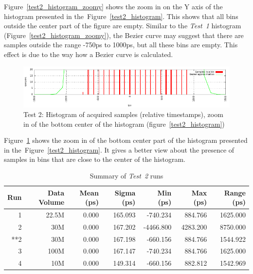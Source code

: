 \documentclass[a4paper, 12pt]{article}
\begin{document}
Figure~\ref{test2_histogram_zoomy} shows the zoom in on the Y axis of
the histogram presented in the~Figure~\ref{test2_histogram}.
This shows that all bins outside the center part of the figure are empty.
Similar to the \textit{Test~1} histogram (Figure~\ref{test2_histogram_zoomy}),
the Bezier curve may suggest that
there are samples outside the range -750ps to 1000ps, but all these bins are
empty.
This effect is due to the way how a Bezier curve is calculated.


\begin{figure}[ht!]
  \centering
  \includegraphics[width=1\textwidth]{img/test2_histogram_zoomx.pdf}
  \caption{Test 2: Histogram of acquired samples (relative timestamps),
           zoom in of the bottom center of the histogram
           (figure~\ref{test2_histogram})}
  \label{test2_histogram_zoomx}
\end{figure}
\FloatBarrier

Figure~\ref{test2_histogram_zoomx} shows the zoom in of the bottom center part
of the histogram presented in the~Figure~\ref{test2_histogram}.
It gives a better view about the presence of samples in bins that are close to
the center of the histogram.


\begin{table}[!htb]
  \centering
  \footnotesize
  \begin{tabular}{|r|r|r|r|r|r|r|}
    \hline {\bf Run} & {\bf Data Volume} & {\bf Mean (ps)} & {\bf Sigma (ps)} & {\bf Min (ps)} & {\bf Max (ps)} & {\bf Range (ps)}  \\
    \hline
    1                & 22.5M             &          0.000  &  165.093         &  -740.234      &   884.766      &     1625.000        \\
    2                & 30M               &          0.000  &  167.202         & -4466.800      &  4283.200      &     8750.000        \\
    **2              & 30M               &          0.000  &  167.198         &  -660.156      &   884.766      &     1544.922        \\
    3                & 100M              &          0.000  &  167.147         &  -740.234      &   884.766      &     1625.000        \\
    4                & 10M               &          0.000  &  149.314         &  -660.156      &   882.812      &     1542.969 \\

    \hline
  \end{tabular}
  \caption{Summary of \textit{Test~2} runs}
  \label{table_test2_summary}
\end{table}
\end{document}

